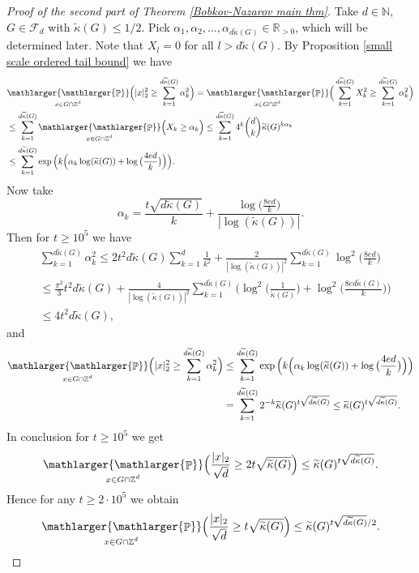 \documentclass[a4paper,oneside, reqno]{amsart}
\numberwithin{equation}{section}
\theoremstyle{definition}%
\theoremstyle{definition}
\theoremstyle{definition}%
\theoremstyle{definition}
\newcommand{\Pro}{\mathop{\mathbb{P}}}
\newcommand{\Z}{\mathbb{Z}}
\newcommand{\R}{\mathbb{R}}
\newcommand{\N}{\mathbb{N}}
\newcommand{\spr}[1]{\underset{_{\substack{#1}}}{\mathlarger{\mathlarger{\Pro}}}}
\begin{document}
\begin{proof}[Proof of the second part of Theorem \ref{Bobkov-Nazarov main thm}] Take $d \in \N$, $G \in \mathcal{F}_d$ with $\widetilde{\kappa}(G) \le 1/2$. Pick $\alpha_1,\alpha_2,\ldots, \alpha_{d\widetilde{\kappa}(G)} \in \R_{>0}$, which will be determined later. Note that $X_l=0$ for all $l>d\widetilde{\kappa}(G)$. By Proposition \ref{small scale ordered tail bound} we have 
\begin{align*}
    &\spr{ x \in G \cap \Z^d}\Big(|x|_2^2 \ge \sum_{k=1}^{d\widetilde{\kappa}(G)} \alpha_k^2 \Big)=\spr{ x \in G \cap \Z^d}\Big(\sum_{k=1}^{d\widetilde{\kappa}(G)} X_k^2 \ge \sum_{k=1}^{d\widetilde{\kappa}(G)} \alpha_k^2 \Big) \\
    &\le \sum_{k=1}^{d\widetilde{\kappa}(G)} \spr{ x \in G \cap \Z^d}\Big(  X_k \ge  \alpha_k \Big) \le \sum_{k=1}^{d\widetilde{\kappa}(G)} 4^k \binom{d}{k} \widetilde{\kappa}(G)^{k\alpha_k} \\
    &\le \sum_{k=1}^{d\widetilde{\kappa}(G)} \exp \Big( k \Big( \alpha_k \log (\widetilde{\kappa}(G))+  \log \big( \frac{4ed}{k} \big) \Big) \Big).
\end{align*}
Now take 
\[
\alpha_k= \frac{t\sqrt{d\widetilde{\kappa}(G)}}{k}+\frac{\log \big( \frac{8ed}{k} \big)}{|\log(\widetilde{\kappa}(G))|}.
\]
Then for $t \ge 10^5$ we have
\begin{align*}
    &\sum_{k=1}^{d\widetilde{\kappa}(G)} \alpha_k^2 \le 2 t^2d\widetilde{\kappa}(G)\sum_{k=1}^d \frac{1}{k^2}+\frac{2}{|\log(\widetilde{\kappa}(G))|^2} \sum_{k=1}^{d \widetilde{\kappa}(G)} \log^2\Big(\frac{8ed}{k}\Big) \\
    &\le \frac{\pi^2}{3} t^2 d \widetilde{\kappa}(G)+ \frac{4}{|\log(\widetilde{\kappa}(G))|^2} \sum_{k=1}^{d \widetilde{\kappa}(G)}\Big(\log^2\Big( \frac{1}{\widetilde{\kappa}(G)}\Big)+ \log^2\Big( \frac{8e d \widetilde{\kappa}(G)}{k}\Big) \Big) \\
    &\le 4 t^2 d\widetilde{\kappa}(G),
\end{align*}
and
\begin{align*}
    \spr{x \in G \cap \Z^d} \Big(|x|_2^2 \ge \sum_{k=1}^{d\widetilde{\kappa}(G)} \alpha_k^2 \Big) &\le \sum_{k=1}^{d\widetilde{\kappa}(G)} \exp \Big( k \Big( \alpha_k \log (\widetilde{\kappa}(G))+  \log \big( \frac{4ed}{k} \big) \Big) \Big) \\
    & = \sum_{k=1}^{d \widetilde{\kappa}(G)} 2^{-k} \widetilde{\kappa}(G)^{t \sqrt{d\widetilde{\kappa}(G)}}  \le\widetilde{\kappa}(G)^{t \sqrt{d\widetilde{\kappa}(G)}}.
\end{align*}
 In conclusion for $t \ge 10^5$ we get
\begin{align*}
   \spr{x \in G \cap \Z^d} \Big( \frac{|x|_2}{\sqrt{d}} \ge 2t \sqrt{\widetilde{\kappa}(G) }\Big) \le  \widetilde{\kappa}(G)^{t \sqrt{d \widetilde{\kappa}(G)}}.
\end{align*}
Hence for any $t \ge 2 \cdot 10^5$ we obtain
\begin{align*}
    \spr{x \in G \cap \Z^d} \Big( \frac{|x|_2}{\sqrt{d}} \ge t  \sqrt{\widetilde{\kappa}(G) } \Big) \le  \widetilde{\kappa}(G)^{ t\sqrt{d\widetilde{\kappa}(G)}/2}.
\end{align*}
\end{proof}
\end{document}
